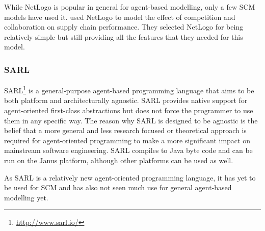 While NetLogo is popular in general for agent-based modelling, only a few SCM models have used it.
 used NetLogo to model the effect of competition and collaboration on supply chain performance.
They selected NetLogo for being relatively simple but still providing all the features that they needed for this model.

\subsubsection{SARL}

SARL\footnote{\url{http://www.sarl.io/}} is a general-purpose agent-based programming language that aims to be both platform and architecturally agnostic.
SARL provides native support for agent-oriented first-class abstractions but does not force the programmer to use them in any specific way.
The reason why SARL is designed to be agnostic is the belief that a more general and less research focused or theoretical approach is required for agent-oriented programming to make a more significant impact on mainstream software engineering.
SARL compiles to Java byte code and can be run on the Janus platform, although other platforms can be used as well.~\cite{rodriguez2014sarl}

As SARL is a relatively new agent-oriented programming language, it has yet to be used for SCM and has also not seen much use for general agent-based modelling yet.
